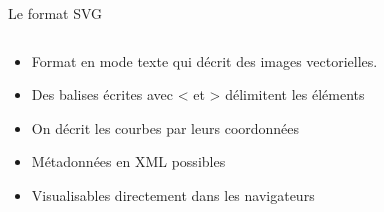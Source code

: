 \begin{frame}{Le format SVG}
  \begin{columns}
    \begin{column}{.5\linewidth}
      \begin{itemize}
      \item Format en mode texte qui décrit des images vectorielles.
      \item Des balises écrites avec < et > délimitent les éléments
      \item On décrit les courbes par leurs coordonnées
      \item Métadonnées en XML possibles
      \item Visualisables directement dans les navigateurs
      \end{itemize}
    \end{column}
    \begin{column}{.5\linewidth}
      
    \end{column}
  \end{columns}
  
\end{frame}

